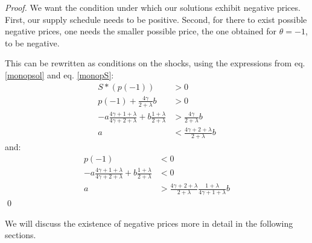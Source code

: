 \begin{proof}
We want the condition under which our solutions exhibit negative prices. First, our supply schedule needs to be positive. Second, for there to exist possible negative prices, one needs the smaller possible price, the one obtained for $\theta=-1$, to be negative.

This can be rewritten as conditions on the shocks, using the expressions from eq. \ref{monopsol} and eq. \ref{monopS}:
\begin{align*}
S*(p(-1))&>0\\
p(-1)+\frac{4\gamma}{2+\lambda}b&>0\\
-a\frac{4\gamma+1+\lambda}{4\gamma+2+\lambda}+ b\frac{1+\lambda}{2+\lambda}&>\frac{4\gamma}{2+\lambda}b\\
a&<\frac{4\gamma+2+\lambda}{2+\lambda}b
\end{align*}
and:
\begin{align*}
p(-1)&<0\\
-a\frac{4\gamma+1+\lambda}{4\gamma+2+\lambda}+ b\frac{1+\lambda}{2+\lambda}&<0\\
a&>\frac{4\gamma+2+\lambda}{2+\lambda}\frac{1+\lambda}{4\gamma+1+\lambda}b
\end{align*} \qed
\end{proof} 

We will discuss the existence of negative prices more in detail in the following sections.


